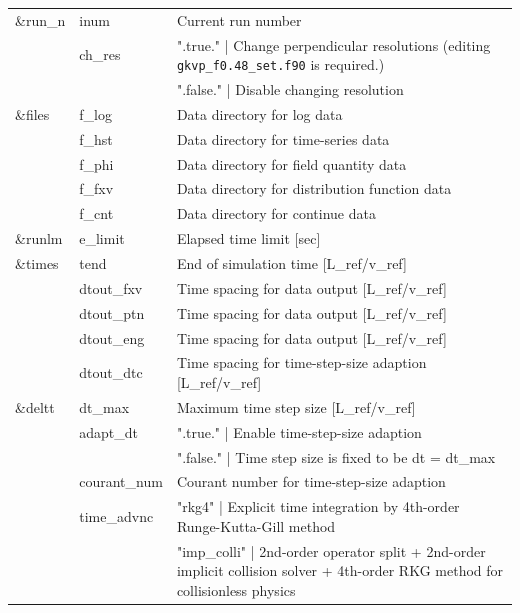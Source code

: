 \begin{longtable}{ l | l | p{10cm} }
  \hline
  \&run\_n & inum & Current run number\\
               \cline{2-3}
             ~ & ch\_res & ".true." | Change perpendicular resolutions (editing \texttt{gkvp\_f0.48\_set.f90} is required.)\\
             ~ &          ~ & ".false." | Disable changing resolution\\
  \hline
  \&files & f\_log & Data directory for log data\\
            \cline{2-3}
         ~ & f\_hst & Data directory for time-series data\\
            \cline{2-3}
         ~ & f\_phi & Data directory for field quantity data\\
            \cline{2-3}
         ~ & f\_fxv & Data directory for distribution function data\\
            \cline{2-3}
         ~ & f\_cnt & Data directory for continue data\\
  \hline
  \&runlm & e\_limit & Elapsed time limit [sec]\\
  \hline
  \&times & tend & End of simulation time [L\_ref/v\_ref]\\
              \cline{2-3}
            ~ & dtout\_fxv & Time spacing for data output [L\_ref/v\_ref]\\
              \cline{2-3}
            ~ & dtout\_ptn & Time spacing for data output [L\_ref/v\_ref]\\
              \cline{2-3}
            ~ & dtout\_eng & Time spacing for data output [L\_ref/v\_ref]\\
              \cline{2-3}
            ~ & dtout\_dtc & Time spacing for time-step-size adaption [L\_ref/v\_ref]\\
  \hline
  \&deltt & dt\_max & Maximum time step size [L\_ref/v\_ref]\\
             \cline{2-3}
          ~ & adapt\_dt & ".true." | Enable time-step-size adaption\\
          ~ &             ~ & ".false." | Time step size is fixed to be dt = dt\_max\\
             \cline{2-3}
          ~ & courant\_num & Courant number for time-step-size adaption\\
             \cline{2-3}
          ~ & time\_advnc & "rkg4" | Explicit time integration by 4th-order Runge-Kutta-Gill method\\
          ~ &                ~ & "imp\_colli" | 2nd-order operator split + 2nd-order implicit collision solver 
                                                      + 4th-order RKG method for collisionless physics\\

\end{longtable}
